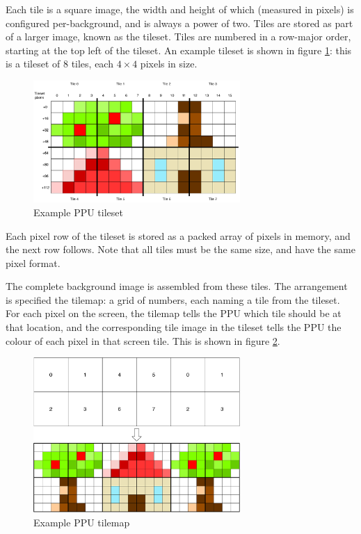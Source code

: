 Each tile is a square image, the width and height of which (measured in pixels) is configured per-background, and is always a power of two. Tiles are stored as part of a larger image, known as the tileset. Tiles are numbered in a row-major order, starting at the top left of the tileset. An example tileset is shown in figure \ref{diagram:ppu_tileset}: this is a tileset of 8 tiles, each $4\times 4$ pixels in size.

\begin{figure}[H]
\centering
\caption{Example PPU tileset}
\label{diagram:ppu_tileset}
\includegraphics[width=0.7\textwidth]{diagrams/ppu_tileset.pdf}
\end{figure}

Each pixel row of the tileset is stored as a packed array of pixels in memory, and the next row follows. Note that all tiles must be the same size, and have the same pixel format.

The complete background image is assembled from these tiles. The arrangement is specified the tilemap: a grid of numbers, each naming a tile from the tileset. For each pixel on the screen, the tilemap tells the PPU which tile should be at that location, and the corresponding tile image in the tileset tells the PPU the colour of each pixel in that screen tile. This is shown in figure \ref{diagram:ppu_tilemap}.

\begin{figure}[H]
\centering
\caption{Example PPU tilemap}
\label{diagram:ppu_tilemap}
\includegraphics[width=0.7\textwidth]{diagrams/ppu_tilemap.pdf}
\end{figure}

